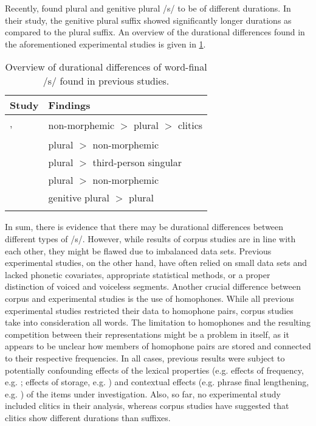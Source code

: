 Recently, \citet{Plag2020} found plural and genitive plural /s/ to be of different durations. In their study, the genitive plural suffix showed significantly longer durations as compared to the plural suffix. An overview of the durational differences found in the aforementioned experimental studies is given in \ref{tab:2.1}.

\begin{table}\fontsize{10}{11}
\caption{Overview of durational differences of word-final /s/ found in previous studies.}
\label{tab:2.1}
\begin{tabular}{ll}
\lsptoprule
Study                                & Findings                                         \\
\midrule
\cite{Zimmermann2016, Plag2017}, & \multirow{2}{*}{non-morphemic $>$
plural $>$ clitics}  \\
\cite{Tomaschek2019}               &                                                  \\
\cite{Walsh1983}                  & plural $>$ non-morphemic                            \\
\cite{Hsieh1999}                   & plural $>$ third-person singular                    \\
\cite{Seyfarth2017}                & plural $>$ non-morphemic                            \\
\cite{Plag2020}                    & genitive plural $>$ plural                 \\
\lspbottomrule
\end{tabular}
\end{table}

In sum, there is evidence that there may be durational differences between different types of /s/. However, while results of corpus studies are in line with each other, they might be flawed due to imbalanced data sets. Previous experimental studies, on the other hand, have often relied on small data sets and lacked phonetic covariates, appropriate statistical methods, or a proper distinction of voiced and voiceless segments. Another crucial difference between corpus and experimental studies is the use of homophones. While all previous experimental studies restricted their data to homophone pairs, corpus studies take into consideration all words. The limitation to homophones and the resulting competition between their representations might be a problem in itself, as it appears to be unclear how members of homophone pairs are stored and connected to their respective frequencies. In all cases, previous results were subject to potentially confounding effects of the lexical properties (e.g. effects of frequency, e.g. \cite{Gahl2008,Lohmann2018}; effects of storage, e.g. \cite{Caselli2016}) and contextual effects (e.g. phrase final lengthening, e.g. \cite{Klatt1976,Wightman1992}) of the items under investigation. Also, so far, no experimental study included clitics in their analysis, whereas corpus studies have suggested that clitics show different durations than suffixes.

